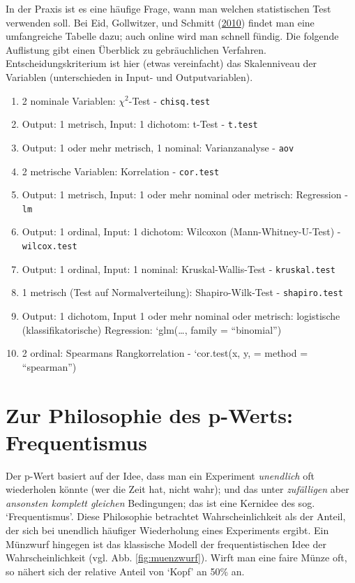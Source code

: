 \documentclass[12pt,ngerman,]{book}
\providecommand{\tightlist}{%
  \setlength{\itemsep}{0pt}\setlength{\parskip}{0pt}}
\theoremstyle{definition}
\theoremstyle{definition}
\theoremstyle{remark}
\begin{document}
In der Praxis ist es eine häufige Frage, wann man welchen statistischen
Test verwenden soll. Bei Eid, Gollwitzer, und Schmitt
(\protect\hyperlink{ref-eid2010statistik}{2010}) findet man eine
umfangreiche Tabelle dazu; auch online wird man schnell fündig. Die
folgende Auflistung gibt einen Überblick zu gebräuchlichen Verfahren.
Entscheidungskriterium ist hier (etwas vereinfacht) das Skalenniveau der
Variablen (unterschieden in Input- und Outputvariablen).

\begin{enumerate}
\def\labelenumi{\arabic{enumi}.}
\tightlist
\item
  2 nominale Variablen: \(\chi^2\)-Test - \texttt{chisq.test}
\item
  Output: 1 metrisch, Input: 1 dichotom: t-Test - \texttt{t.test}
\item
  Output: 1 oder mehr metrisch, 1 nominal: Varianzanalyse - \texttt{aov}
\item
  2 metrische Variablen: Korrelation - \texttt{cor.test}
\item
  Output: 1 metrisch, Input: 1 oder mehr nominal oder metrisch:
  Regression - \texttt{lm}
\item
  Output: 1 ordinal, Input: 1 dichotom: Wilcoxon (Mann-Whitney-U-Test) -
  \texttt{wilcox.test}
\item
  Output: 1 ordinal, Input: 1 nominal: Kruskal-Wallis-Test -
  \texttt{kruskal.test}
\item
  1 metrisch (Test auf Normalverteilung): Shapiro-Wilk-Test -
  \texttt{shapiro.test}
\item
  Output: 1 dichotom, Input 1 oder mehr nominal oder metrisch:
  logistische (klassifikatorische) Regression: `glm(\ldots{}, family =
  ``binomial'')
\item
  2 ordinal: Spearmans Rangkorrelation - `cor.test(x, y, = method =
  ``spearman'')
\end{enumerate}

\section{Zur Philosophie des p-Werts:
Frequentismus}\label{zur-philosophie-des-p-werts-frequentismus}

Der p-Wert basiert auf der Idee, dass man ein Experiment
\emph{unendlich} oft wiederholen könnte (wer die Zeit hat, nicht wahr);
und das unter \emph{zufälligen} aber \emph{ansonsten komplett gleichen}
Bedingungen; das ist eine Kernidee des sog. `Frequentismus'. Diese
Philosophie betrachtet Wahrscheinlichkeit als der Anteil, der sich bei
unendlich häufiger Wiederholung eines Experiments ergibt. Ein Münzwurf
hingegen ist das klassische Modell der frequentistischen Idee der
Wahrscheinlichkeit (vgl. Abb. \ref{fig:muenzwurf}). Wirft man eine faire
Münze oft, so nähert sich der relative Anteil von `Kopf' an 50\% an.
\end{document}
